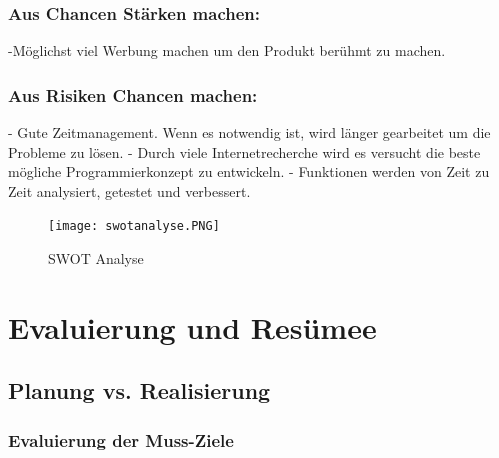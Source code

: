 \newpage
\subsection*{Aus Chancen Stärken machen:}
-Möglichst viel Werbung machen um den Produkt berühmt zu machen.

\subsection*{Aus Risiken Chancen machen:}
- Gute Zeitmanagement. Wenn es notwendig ist, wird länger gearbeitet um die Probleme zu lösen. 
- Durch viele Internetrecherche wird es versucht die beste mögliche Programmierkonzept zu entwickeln. 
- Funktionen werden von Zeit zu Zeit analysiert, getestet und verbessert.

\begin{figure}[!h]
  \texttt{[image: swotanalyse.PNG]}
  \caption{SWOT Analyse}
  \label{fig:Swot Analyse}
\end{figure}

\chapter{Evaluierung und Resümee}
\section{Planung vs. Realisierung}
\subsection{Evaluierung der Muss-Ziele}

